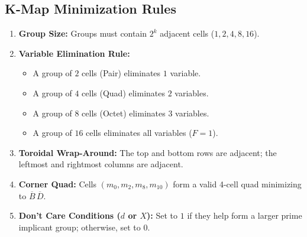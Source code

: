 \subsection{K-Map Minimization Rules}
\begin{enumerate}
    \item \textbf{Group Size:} Groups must contain $2^k$ adjacent cells ($1, 2, 4, 8, 16$).
    \item \textbf{Variable Elimination Rule:}
    \begin{itemize}
        \item A group of $2$ cells (Pair) eliminates $1$ variable.
        \item A group of $4$ cells (Quad) eliminates $2$ variables.
        \item A group of $8$ cells (Octet) eliminates $3$ variables.
        \item A group of $16$ cells eliminates all variables ($F = 1$).
    \end{itemize}
    \item \textbf{Toroidal Wrap-Around:} The top and bottom rows are adjacent; the leftmost and rightmost columns are adjacent.
    \item \textbf{Corner Quad:} Cells $(m_0, m_2, m_8, m_{10})$ form a valid 4-cell quad minimizing to $\overline{B}\,\overline{D}$.
    \item \textbf{Don't Care Conditions ($d$ or $X$):} Set to $1$ if they help form a larger prime implicant group; otherwise, set to $0$.
\end{enumerate}

